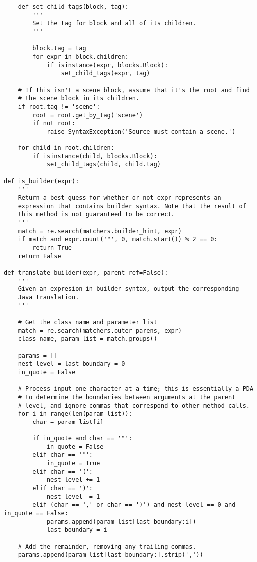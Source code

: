 \begin{lstlisting}
    def set_child_tags(block, tag):
        '''
        Set the tag for block and all of its children.
        '''

        block.tag = tag
        for expr in block.children:
            if isinstance(expr, blocks.Block):
                set_child_tags(expr, tag)

    # If this isn't a scene block, assume that it's the root and find
    # the scene block in its children.
    if root.tag != 'scene':
        root = root.get_by_tag('scene')
        if not root:
            raise SyntaxException('Source must contain a scene.')
    
    for child in root.children:
        if isinstance(child, blocks.Block):
            set_child_tags(child, child.tag)

def is_builder(expr):
    '''
    Return a best-guess for whether or not expr represents an
    expression that contains builder syntax. Note that the result of
    this method is not guaranteed to be correct.
    '''
    match = re.search(matchers.builder_hint, expr)
    if match and expr.count('"', 0, match.start()) % 2 == 0:
        return True
    return False

def translate_builder(expr, parent_ref=False):
    '''
    Given an expresion in builder syntax, output the corresponding
    Java translation.
    '''

    # Get the class name and parameter list
    match = re.search(matchers.outer_parens, expr)
    class_name, param_list = match.groups()
    
    params = []
    nest_level = last_boundary = 0
    in_quote = False

    # Process input one character at a time; this is essentially a PDA
    # to determine the boundaries between arguments at the parent
    # level, and ignore commas that correspond to other method calls.
    for i in range(len(param_list)):
        char = param_list[i]

        if in_quote and char == '"':
            in_quote = False
        elif char == '"':
            in_quote = True
        elif char == '(':
            nest_level += 1
        elif char == ')':
            nest_level -= 1
        elif (char == ',' or char == ')') and nest_level == 0 and in_quote == False:
            params.append(param_list[last_boundary:i])
            last_boundary = i

    # Add the remainder, removing any trailing commas.
    params.append(param_list[last_boundary:].strip(','))


\end{lstlisting}
